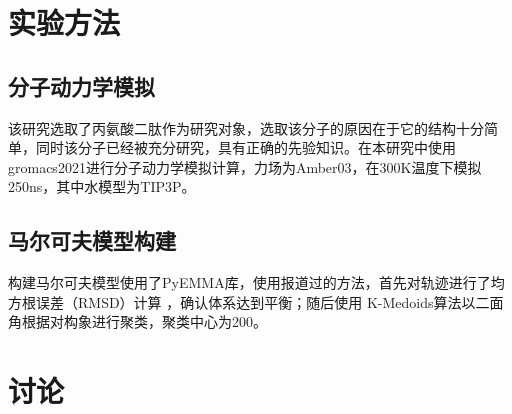 \documentclass[a4paper]{article}
\begin{document}
\begin{CJK}{UTF8}{gbsn}
\section{实验方法}
	\subsection{分子动力学模拟}

该研究选取了丙氨酸二肽作为研究对象，选取该分子的原因在于它的结构十分简单，同时该分子已经被充分研究，具有正确的先验知识。在本研究中使用gromacs2021进行分子动力学模拟计算，力场为Amber03，在300K温度下模拟250ns，其中水模型为TIP3P。

	\subsection{马尔可夫模型构建}
构建马尔可夫模型使用了PyEMMA库，使用报道过的方法，首先对轨迹进行了均方根误差（RMSD）计算 ，确认体系达到平衡；随后使用 K-Medoids算法以二面角根据对构象进行聚类，聚类中心为200。

\section{讨论}



\end{CJK}
\end{document}
